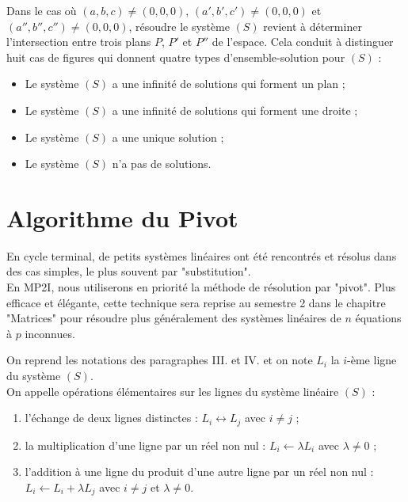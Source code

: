 \begin{defprop}
	Dans le cas où \((a,b,c)\neq (0,0,0)\), \((a',b',c')\neq (0,0,0)\) et \((a'',b'',c'')\neq (0,0,0)\), résoudre le système \((S)\) revient à déterminer l’intersection entre trois plans \(P\), \(P'\) et \(P''\) de l’espace.
	Cela conduit à distinguer huit cas de figures qui donnent quatre types d’ensemble-solution pour \((S)\) :
	\begin{itemize}
		\item Le système \((S)\) a une infinité de solutions qui forment un plan ;
		\item Le système \((S)\) a une infinité de solutions qui forment une droite ;
		\item Le système \((S)\) a une unique solution ;
		\item Le système \((S)\) n’a pas de solutions.
	\end{itemize}
\end{defprop}

\section{Algorithme du Pivot}
\begin{rem} 
	En cycle terminal, de petits systèmes linéaires ont été rencontrés et résolus dans des cas simples, le plus souvent par "substitution". \\
	En MP2I, nous utiliserons en priorité la méthode de résolution par "pivot". Plus efficace et élégante, cette technique sera reprise au semestre 2 dans le chapitre "Matrices" pour résoudre plus généralement des systèmes linéaires de \(n\) équations à \(p\) inconnues.
\end{rem}

\begin{defprop}
	On reprend les notations des paragraphes III. et IV. et on note \(L_i\) la \(i\)-ème ligne du système \((S)\).\\
	On appelle opérations élémentaires sur les lignes du système linéaire \((S)\) :
	\begin{enumerate}
		\item l’échange de deux lignes distinctes : \(L_i \leftrightarrow L_j\) avec \(i\neq j\) ;
		\item la multiplication d'une ligne par un réel non nul : \(L_i \leftarrow \lambda L_i\) avec \(\lambda\neq 0\) ;
		\item l'addition à une ligne du produit d'une autre ligne par un réel non nul : \(L_i \leftarrow L_i + \lambda L_j\) avec \(i\neq j\) et \(\lambda\neq 0\).
	\end{enumerate}
\end{defprop}


